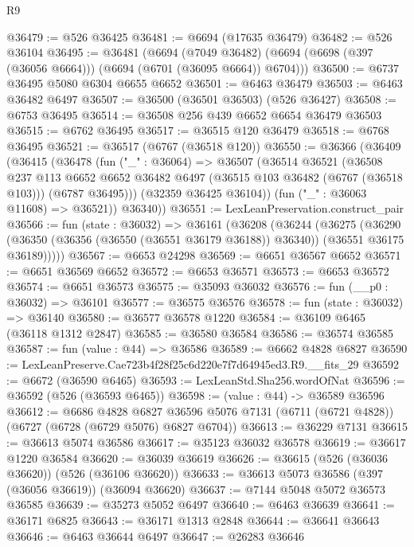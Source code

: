 \begin{lexlean}{R9}
\begin{coremodule}
@36479 := @526 @36425
@36481 := @6694 (@17635 @36479)
@36482 := @526 @36104
@36495 := @36481
    (@6694
      (@7049 @36482)
      (@6694 (@6698 (@397 (@36056 @6664))) (@6694 (@6701 (@36095 @6664)) @6704)))
@36500 := @6737 @36495 @5080 @6304 @6655 @6652
@36501 := @6463 @36479
@36503 := @6463 @36482 @6497
@36507 := @36500 (@36501 @36503) (@526 @36427)
@36508 := @6753 @36495
@36514 := @36508 @256 @439 @6652 @6654 @36479 @36503
@36515 := @6762 @36495
@36517 := @36515 @120 @36479
@36518 := @6768 @36495
@36521 := @36517 (@6767 (@36518 @120))
@36550 := @36366
    (@36409
      (@36415
        (@36478
          (fun ("_" : @36064) =>
          @36507
            (@36514
              @36521
              (@36508
                @237
                @113
                @6652
                @6652
                @36482
                @6497
                (@36515 @103 @36482 (@6767 (@36518 @103)))
                (@6787 @36495)))
            (@32359 @36425 @36104))
          (fun ("_" : @36063 @11608) => @36521))
        @36340))
@36551 := LexLeanPreservation.construct_pair
@36566 := fun (state : @36032) =>
  @36161
    (@36208
      (@36244
        (@36275
          (@36290
            (@36350 (@36356 (@36550 (@36551 @36179 @36188)) @36340))
            (@36551 @36175 @36189)))))
@36567 := @6653 @24298
@36569 := @6651 @36567 @6652
@36571 := @6651 @36569 @6652
@36572 := @6653 @36571
@36573 := @6653 @36572
@36574 := @6651 @36573
@36575 := @35093 @36032
@36576 := fun (__p0 : @36032) => @36101
@36577 := @36575 @36576
@36578 := fun (state : @36032) => @36140
@36580 := @36577 @36578 @1220
@36584 := @36109 @6465 (@36118 @1312 @2847)
@36585 := @36580 @36584
@36586 := @36574 @36585
@36587 := fun (value : @44) => @36586
@36589 := @6662 @4828 @6827
@36590 := LexLeanPreserve.Cae723b4f28f25c6d220e7f7d64945ed3.R9.__fits_29
@36592 := @6672 (@36590 @6465)
@36593 := LexLeanStd.Sha256.wordOfNat
@36596 := @36592 (@526 (@36593 @6465))
@36598 := (value : @44) -> @36589 @36596
@36612 := @6686
    @4828
    @6827
    @36596
    @5076
    @7131
    (@6711 (@6721 @4828))
    (@6727 (@6728 (@6729 @5076) @6827 @6704))
@36613 := @36229 @7131
@36615 := @36613 @5074 @36586
@36617 := @35123 @36032 @36578
@36619 := @36617 @1220 @36584
@36620 := @36039 @36619
@36626 := @36615 (@526 (@36036 @36620)) (@526 (@36106 @36620))
@36633 := @36613 @5073 @36586 (@397 (@36056 @36619)) (@36094 @36620)
@36637 := @7144 @5048 @5072 @36573 @36585
@36639 := @35273 @5052 @6497
@36640 := @6463 @36639
@36641 := @36171 @6825
@36643 := @36171 @1313 @2848
@36644 := @36641 @36643
@36646 := @6463 @36644 @6497
@36647 := @26283 @36646

\end{coremodule}
\end{lexlean}
